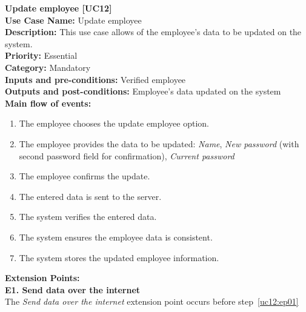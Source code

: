 \documentclass[11pt,twoside]{article}
\begin{document}
\textbf{Update employee [UC12]}\\
\textbf{Use Case Name:} Update employee\\
\textbf{Description:} This use case allows of the employee's data to be updated on the system.\\
\textbf{Priority:} Essential \\
\textbf{Category:} Mandatory\\
\textbf{Inputs and pre-conditions:} Verified employee \\
\textbf{Outputs and post-conditions:} Employee's data updated on the system\\
\textbf{Main flow of events:}\\
\begin{enumerate}
\item The employee chooses the update employee option.
\item The employee provides the data to be updated: \textit{Name}, \textit{New password} (with second password field for confirmation),
\textit{Current password}
\item The employee confirms the update.
\item \label{uc12:ep01}The entered data is sent to the server.
\item The system verifies the entered data.
\item The system ensures the employee data is consistent.
\item The system stores the updated employee information.
\end{enumerate}

\textbf{Extension Points:}\\
\textbf{E1. Send data over the internet}\\
The \textit{Send data over the internet} extension point occurs before step~\ref{uc12:ep01}
\end{document}
